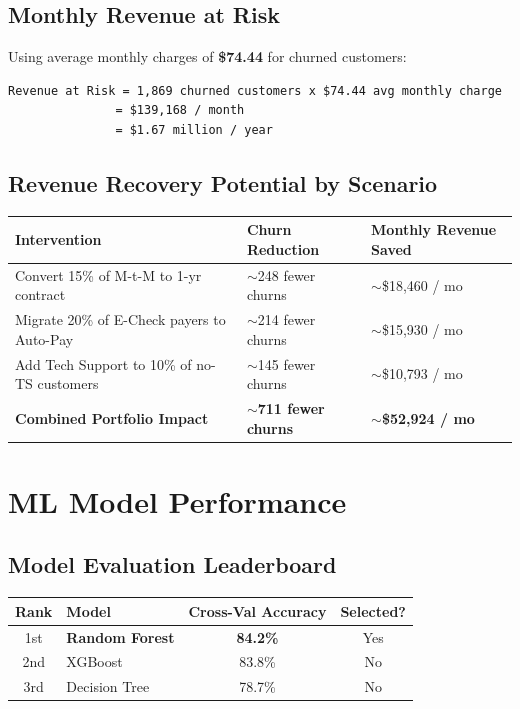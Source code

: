 \documentclass[11pt,a4paper]{article}
\begin{document}
\subsection{Monthly Revenue at Risk}
Using average monthly charges of \textbf{\$74.44} for churned customers:
\begin{lstlisting}[basicstyle=\ttfamily]
Revenue at Risk = 1,869 churned customers x $74.44 avg monthly charge
               = $139,168 / month
               = $1.67 million / year
\end{lstlisting}

\subsection{Revenue Recovery Potential by Scenario}

\begin{longtable}{l l l}
\toprule
\textbf{Intervention} & \textbf{Churn Reduction} & \textbf{Monthly Revenue Saved} \\
\midrule
Convert 15\% of M-t-M to 1-yr contract & $\sim$248 fewer churns & $\sim$\$18,460 / mo \\
Migrate 20\% of E-Check payers to Auto-Pay & $\sim$214 fewer churns & $\sim$\$15,930 / mo \\
Add Tech Support to 10\% of no-TS customers & $\sim$145 fewer churns & $\sim$\$10,793 / mo \\
\midrule
\textbf{Combined Portfolio Impact} & \textbf{$\sim$711 fewer churns} & \textbf{$\sim$\$52,924 / mo} \\
\bottomrule
\end{longtable}

\section{ML Model Performance}

\subsection{Model Evaluation Leaderboard}

\begin{table}[h!]
\centering
\begin{tabular}{c l c c}
\toprule
\textbf{Rank} & \textbf{Model} & \textbf{Cross-Val Accuracy} & \textbf{Selected?} \\
\midrule
1st & \textbf{Random Forest} & \textbf{84.2\%} & Yes \\
2nd & XGBoost & 83.8\% & No \\
3rd & Decision Tree & 78.7\% & No \\
\bottomrule
\end{tabular}
\end{table}
\end{document}
